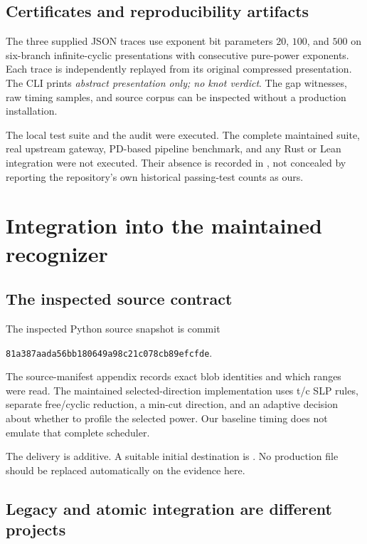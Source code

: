 \documentclass[11pt,letterpaper]{article}
\theoremstyle{definition}
\theoremstyle{remark}\newtheorem{remark}[theorem]{Remark}
\begin{document}
\subsection{Certificates and reproducibility artifacts}

The three supplied JSON traces use exponent bit parameters $20$, $100$, and
$500$ on six-branch infinite-cyclic presentations with consecutive pure-power
exponents. Each trace is independently replayed from its original compressed
presentation. The CLI prints \emph{abstract presentation only; no knot verdict}.
The gap witnesses, raw timing samples, and source corpus can be
inspected without a production installation.

The local test suite and the audit were executed. The complete maintained
suite, real upstream gateway, PD-based pipeline benchmark, and any Rust or
Lean integration were not executed. Their absence is recorded in
, not concealed by reporting the repository's
own historical passing-test counts as ours.

\section{Integration into the maintained recognizer}
\label{sec:integration}

\subsection{The inspected source contract}

The inspected Python source snapshot is commit
\begin{center}
\small\texttt{81a387aada56bb180649a98c21c078cb89efcfde}.
\end{center}
The source-manifest appendix records exact blob identities and which ranges
were read. The maintained selected-direction implementation uses t/c SLP rules,
separate free/cyclic reduction, a min-cut direction, and an adaptive decision
about whether to profile the selected power. Our baseline timing does not
emulate that complete scheduler.

The delivery is additive. A suitable initial destination is
.
No production file should be replaced automatically on the evidence here.

\subsection{Legacy and atomic integration are different projects}
\end{document}
